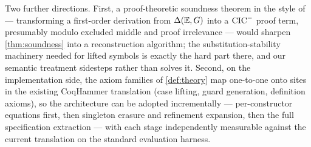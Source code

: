 Two further directions.  First, a proof-theoretic soundness theorem in
the style of \cite{Czajka2018} --- transforming a first-order
derivation from $\Delta(\mathbb{E},G)$ into a $\mathrm{CIC}^{-}$ proof term, presumably modulo
excluded middle and proof irrelevance --- would sharpen
\cref{thm:soundness} into a reconstruction algorithm; the
substitution-stability machinery needed for lifted symbols is exactly
the hard part there, and our semantic treatment sidesteps rather than
solves it.  Second, on the implementation side, the axiom families of
\cref{def:theory} map one-to-one onto sites in the existing CoqHammer
translation (case lifting, guard generation, definition axioms), so the
architecture can be adopted incrementally --- per-constructor equations
first, then singleton erasure and refinement expansion, then the full
specification extraction --- with each stage independently measurable
against the current translation on the standard evaluation harness.
